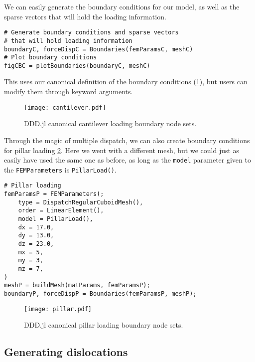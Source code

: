 We can easily generate the boundary conditions for our model, as well as the sparse vectors that will hold the loading information.
\begin{verbatim}
# Generate boundary conditions and sparse vectors 
# that will hold loading information
boundaryC, forceDispC = Boundaries(femParamsC, meshC)
# Plot boundary conditions
figCBC = plotBoundaries(boundaryC, meshC)
\end{verbatim}
This uses our canonical definition of the boundary conditions (\cref{f:cantileverNodeSet}), but users can modify them through keyword arguments.
\begin{figure}
    \centering
    \texttt{[image: cantilever.pdf]}
    \caption{DDD.jl canonical cantilever loading boundary node sets.}
    \label{f:cantileverNodeSet}
\end{figure}
Through the magic of multiple dispatch, we can also create boundary conditions for pillar loading \cref{f:pillarLoad}. Here we went with a different mesh, but we could just as easily have used the same one as before, as long as the \texttt{model} parameter given to the \texttt{FEMParameters} is \texttt{PillarLoad()}.
\begin{verbatim}
# Pillar loading
femParamsP = FEMParameters(;
    type = DispatchRegularCuboidMesh(),
    order = LinearElement(),
    model = PillarLoad(),
    dx = 17.0,
    dy = 13.0,
    dz = 23.0,
    mx = 5,
    my = 3,
    mz = 7,
)
meshP = buildMesh(matParams, femParamsP);
boundaryP, forceDispP = Boundaries(femParamsP, meshP);
\end{verbatim}
\begin{figure}
    \centering
    \texttt{[image: pillar.pdf]}
    \caption{DDD.jl canonical pillar loading boundary node sets.}
    \label{f:pillarLoad}
\end{figure}

\subsection{Generating dislocations}

